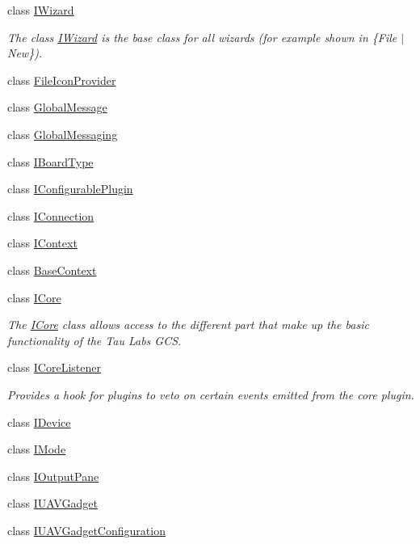 \begin{DoxyCompactItemize}
class \hyperlink{class_core_1_1_i_wizard}{I\-Wizard}
\begin{DoxyCompactList}\small\item\em The class \hyperlink{class_core_1_1_i_wizard}{I\-Wizard} is the base class for all wizards (for example shown in  \{File $|$ New\}). \end{DoxyCompactList}\item 
class \hyperlink{class_core_1_1_file_icon_provider}{File\-Icon\-Provider}
\item 
class \hyperlink{class_core_1_1_global_message}{Global\-Message}
\item 
class \hyperlink{class_core_1_1_global_messaging}{Global\-Messaging}
\item 
class \hyperlink{class_core_1_1_i_board_type}{I\-Board\-Type}
\item 
class \hyperlink{class_core_1_1_i_configurable_plugin}{I\-Configurable\-Plugin}
\item 
class \hyperlink{class_core_1_1_i_connection}{I\-Connection}
\item 
class \hyperlink{class_core_1_1_i_context}{I\-Context}
\item 
class \hyperlink{class_core_1_1_base_context}{Base\-Context}
\item 
class \hyperlink{class_core_1_1_i_core}{I\-Core}
\begin{DoxyCompactList}\small\item\em The \hyperlink{class_core_1_1_i_core}{I\-Core} class allows access to the different part that make up the basic functionality of the Tau Labs G\-C\-S. \end{DoxyCompactList}\item 
class \hyperlink{class_core_1_1_i_core_listener}{I\-Core\-Listener}
\begin{DoxyCompactList}\small\item\em Provides a hook for plugins to veto on certain events emitted from the core plugin. \end{DoxyCompactList}\item 
class \hyperlink{class_core_1_1_i_device}{I\-Device}
\item 
class \hyperlink{class_core_1_1_i_mode}{I\-Mode}
\item 
class \hyperlink{class_core_1_1_i_output_pane}{I\-Output\-Pane}
\item 
class \hyperlink{class_core_1_1_i_u_a_v_gadget}{I\-U\-A\-V\-Gadget}
\item 
class \hyperlink{class_core_1_1_i_u_a_v_gadget_configuration}{I\-U\-A\-V\-Gadget\-Configuration}

\end{DoxyCompactItemize}
